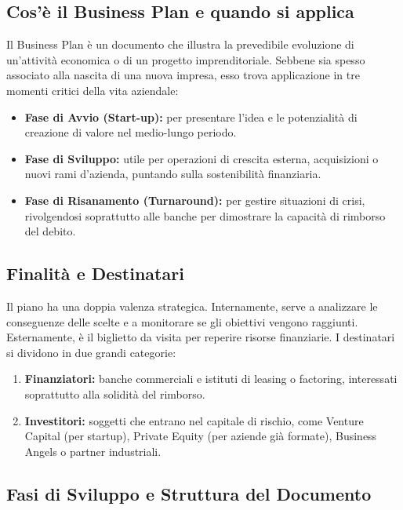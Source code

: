 \documentclass[a4paper,10pt]{article}
\begin{document}
\subsection*{Cos'è il Business Plan e quando si applica}

Il Business Plan è un documento che illustra la prevedibile evoluzione di un'attività economica o di un progetto imprenditoriale. Sebbene sia spesso associato alla nascita di una nuova impresa, esso trova applicazione in tre momenti critici della vita aziendale:
\begin{itemize}
    \item \textbf{Fase di Avvio (Start-up):} per presentare l'idea e le potenzialità di creazione di valore nel medio-lungo periodo.
    \item \textbf{Fase di Sviluppo:} utile per operazioni di crescita esterna, acquisizioni o nuovi rami d'azienda, puntando sulla sostenibilità finanziaria.
    \item \textbf{Fase di Risanamento (Turnaround):} per gestire situazioni di crisi, rivolgendosi soprattutto alle banche per dimostrare la capacità di rimborso del debito.
\end{itemize}

\subsection*{Finalità e Destinatari}

Il piano ha una doppia valenza strategica. Internamente, serve a analizzare le conseguenze delle scelte e a monitorare se gli obiettivi vengono raggiunti. Esternamente, è il biglietto da visita per reperire risorse finanziarie.
I destinatari si dividono in due grandi categorie:
\begin{enumerate}
    \item \textbf{Finanziatori:} banche commerciali e istituti di leasing o factoring, interessati soprattutto alla solidità del rimborso.
    \item \textbf{Investitori:} soggetti che entrano nel capitale di rischio, come Venture Capital (per startup), Private Equity (per aziende già formate), Business Angels o partner industriali.
\end{enumerate}

\subsection*{Fasi di Sviluppo e Struttura del Documento}
\end{document}
